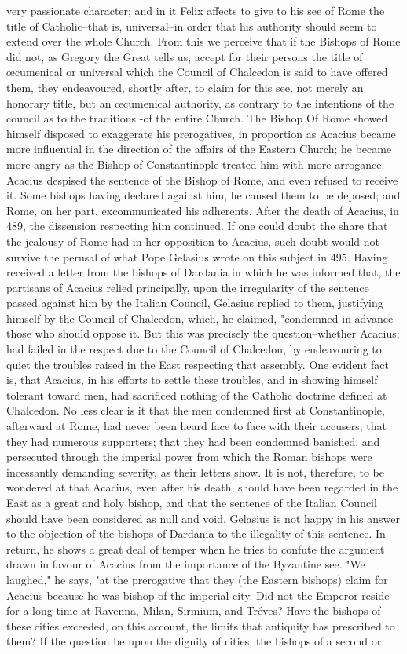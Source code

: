very passionate character; and in it Felix affects to give to his see of Rome the title of Catholic--that is, universal--in order that his authority should seem to extend over the whole Church. From this we perceive that if the Bishops of Rome did not, as Gregory the Great tells us, accept for their persons the title of œcumenical or universal which the Council of Chalcedon is said to have offered them, they endeavoured, shortly after, to claim for this see, not merely an honorary title, but an œcumenical authority, as contrary to the intentions of the council as to the traditions -of the entire Church. The Bishop Of Rome showed himself disposed to exaggerate his prerogatives, in proportion as Acacius became more influential in the direction of the affairs of the Eastern Church; he became more angry as the Bishop of Constantinople treated him with more arrogance. Acacius despised the sentence of the Bishop of Rome, and even refused to receive it. Some bishops having declared against him, he caused them to be deposed; and Rome, on her part, excommunicated his adherents. After the death of Acacius, in 489, the dissension respecting him continued. If one could doubt the share that the jealousy of Rome had in her opposition to Acacius, such doubt would not survive the perusal of what Pope Gelasius wrote on this subject in 495. Having received a letter from the bishops of Dardania in which he was informed that, the partisans of Acacius relied principally, upon the irregularity of the sentence passed against him by the Italian Council, Gelasius replied to them, justifying himself by the Council of Chalcedon, which, he claimed, "condemned in advance those who should oppose it. But this was precisely the question--whether Acacius; had failed in the respect due to the Council of Chalcedon, by endeavouring to quiet the troubles raised in the East respecting that assembly. One evident fact is, that Acacius, in his efforts to settle these troubles, and in showing himself tolerant toward men, had sacrificed nothing of the Catholic doctrine defined at Chalcedon. No less clear is it that the men condemned first at Constantinople, afterward at Rome, had never been heard face to face with their accusers; that they had numerous supporters; that they had been condemned banished, and persecuted through the imperial power from which the Roman bishops were incessantly demanding severity, as their letters show. It is not, therefore, to be wondered at that Acacius, even after his death, should have been regarded in the East as a great and holy bishop, and that the sentence of the Italian Council should have been considered as null and void. Gelasius is not happy in his answer to the objection of the bishops of Dardania to the illegality of this sentence. In return, he shows a great deal of temper when he tries to confute the argument drawn in favour of Acacius from the importance of the Byzantine see. "We laughed," he says, "at the prerogative that they (the Eastern bishops) claim for Acacius because he was bishop of the imperial city. Did not the Emperor reside for a long time at Ravenna, Milan, Sirmium, and Tréves? Have the bishops of these cities exceeded, on this account, the limits that antiquity has prescribed to them? If the question be upon the dignity of cities, the bishops of a second or 